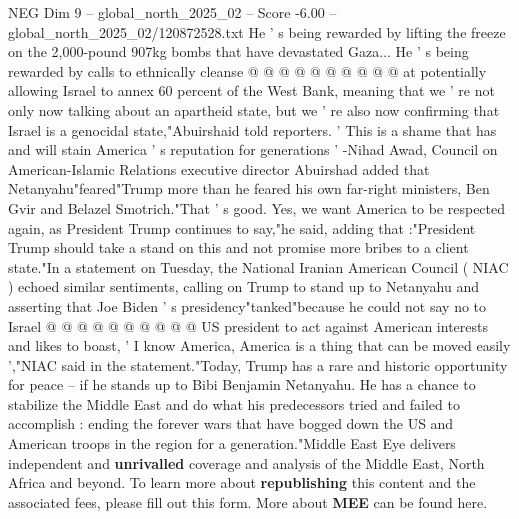 \begin{textsample}{NEG Dim 9 – global\_north\_2025\_02 – Score -6.00 – global\_north\_2025\_02/120872528.txt}
He ' s being rewarded by lifting the freeze on the 2,000-pound 907kg bombs that have devastated Gaza...
He ' s being rewarded by calls to ethnically cleanse @ @ @ @ @ @ @ @ @ @ at potentially allowing Israel to annex 60 percent of the West Bank, meaning that we ' re not only now talking about an apartheid state, but we ' re also now confirming that Israel is a genocidal state,"Abuirshaid told reporters. ' This is a shame that has and will stain America ' s reputation for generations ' -Nihad Awad, Council on American-Islamic Relations executive director Abuirshad added that Netanyahu"feared"Trump more than he feared his own far-right ministers, Ben Gvir and Belazel Smotrich."That ' s good.
Yes, we want America to be respected again, as President Trump continues to say,"he said, adding that :"President Trump should take a stand on this and not promise more bribes to a client state."In a statement on Tuesday, the National Iranian American Council ( NIAC ) echoed similar sentiments, calling on Trump to stand up to Netanyahu and asserting that Joe Biden ' s presidency"tanked"because he could not say no to Israel @ @ @ @ @ @ @ @ @ @ US president to act against American interests and likes to boast, ' I know America, America is a thing that can be moved easily ',"NIAC said in the statement."Today, Trump has a rare and historic opportunity for peace -- if he stands up to Bibi Benjamin Netanyahu.
He has a chance to stabilize the Middle East and do what his predecessors tried and failed to accomplish : ending the forever wars that have bogged down the US and American troops in the region for a generation."Middle East Eye delivers independent and \textbf{unrivalled} coverage and analysis of the Middle East, North Africa and beyond.
To learn more about \textbf{republishing} this content and the associated fees, please fill out this form.
More about \textbf{MEE} can be found here.

\end{textsample}
